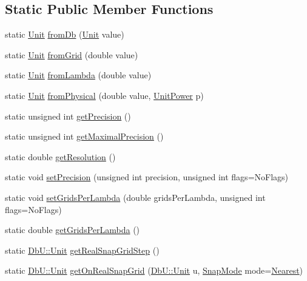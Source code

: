 \subsection*{Static Public Member Functions}
\begin{DoxyCompactItemize}
\item 
static \hyperlink{group__DbUGroup_ga4fbfa3e8c89347af76c9628ea06c4146}{Unit} \hyperlink{group__DbUGroup_gaec69d65ec1651c2feea24c5931f4580b}{from\-Db} (\hyperlink{group__DbUGroup_ga4fbfa3e8c89347af76c9628ea06c4146}{Unit} value)
\item 
static \hyperlink{group__DbUGroup_ga4fbfa3e8c89347af76c9628ea06c4146}{Unit} \hyperlink{group__DbUGroup_ga367e1d1b5ac1df076745550cba8a83c1}{from\-Grid} (double value)
\item 
static \hyperlink{group__DbUGroup_ga4fbfa3e8c89347af76c9628ea06c4146}{Unit} \hyperlink{group__DbUGroup_ga4b570755b19ea9ff0f2f258a221bd935}{from\-Lambda} (double value)
\item 
static \hyperlink{group__DbUGroup_ga4fbfa3e8c89347af76c9628ea06c4146}{Unit} \hyperlink{group__DbUGroup_ga11d4dbd9134a19bda35cbacde1cb2769}{from\-Physical} (double value, \hyperlink{group__DbUGroup_ga50b5785bf4d75026c4c112caec3040a7}{Unit\-Power} p)
\item 
static unsigned int \hyperlink{group__DbUGroup_ga6169efbdd9b3d54a0bd8467c8f957fda}{get\-Precision} ()
\item 
static unsigned int \hyperlink{group__DbUGroup_ga8756c9f0a32af5f601cd150e73b02c03}{get\-Maximal\-Precision} ()
\item 
static double \hyperlink{group__DbUGroup_ga120a60b09b344d01c583567a1e489d9e}{get\-Resolution} ()
\item 
static void \hyperlink{group__DbUGroup_gace9a8644e7e80dcaed2a8a95deeb1622}{set\-Precision} (unsigned int precision, unsigned int flags=No\-Flags)
\item 
static void \hyperlink{group__DbUGroup_gac93f9ba2a09105227e34bd05bcb1500c}{set\-Grids\-Per\-Lambda} (double grids\-Per\-Lambda, unsigned int flags=No\-Flags)
\item 
static double \hyperlink{group__DbUGroup_ga9a0359adbfafc356326f5c6adf57ff04}{get\-Grids\-Per\-Lambda} ()
\item 
static \hyperlink{group__DbUGroup_ga4fbfa3e8c89347af76c9628ea06c4146}{Db\-U\-::\-Unit} \hyperlink{group__DbUGroup_ga09e46fcca6aaca94851adfa196e10170}{get\-Real\-Snap\-Grid\-Step} ()
\item 
static \hyperlink{group__DbUGroup_ga4fbfa3e8c89347af76c9628ea06c4146}{Db\-U\-::\-Unit} \hyperlink{group__DbUGroup_ga8746e486f153aa37ee469c1604eba5c0}{get\-On\-Real\-Snap\-Grid} (\hyperlink{group__DbUGroup_ga4fbfa3e8c89347af76c9628ea06c4146}{Db\-U\-::\-Unit} u, \hyperlink{group__DbUGroup_ga1082168d6f9956ebba22ab8bbec21637}{Snap\-Mode} mode=\hyperlink{group__DbUGroup_gga1082168d6f9956ebba22ab8bbec21637a65e6f47eb16779b8974a80d6145a2db5}{Nearest})

\end{DoxyCompactItemize}
